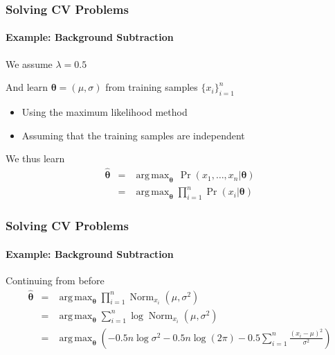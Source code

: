 \documentclass[xetex,professionalfont]{beamer}
\DeclareMathOperator*{\argmax}{arg\,max}
\DeclareMathOperator*{\Norm}{Norm}
\newcommand{\bth}{\boldsymbol{\theta}}
\begin{document}

\begin{frame}
\frametitle{Solving CV Problems}
\framesubtitle{Example: Background Subtraction}

We assume $\lambda=0.5$ %

\bigskip
And learn $\bth=(\mu,\sigma)$ from training samples $\{x_i\}_{i=1}^n$ %
\begin{itemize}
    \item Using the maximum likelihood method %
    \item Assuming that the training samples are independent %
\end{itemize}

\bigskip
We thus learn
\begin{eqnarray*}
  \hat{\bth}&=&\argmax_{\bth}\,\Pr(x_1,\dots,x_n|\bth) \\ %
  &=&\argmax_{\bth}\prod_{i=1}^n \Pr(x_i|\bth) %
\end{eqnarray*}

\end{frame}


\begin{frame}
\frametitle{Solving CV Problems}
\framesubtitle{Example: Background Subtraction}

Continuing from before 
\begin{eqnarray*}
  \hat{\bth}&=&\argmax_{\bth}\prod_{i=1}^n \Norm_{x_i}(\mu,\sigma^2) \\ %
  &=&\argmax_{\bth}\sum_{i=1}^n\log \Norm_{x_i}(\mu,\sigma^2) \\ %
  &=&\argmax_{\bth}\left(-0.5 n\log\sigma^2-0.5n\log(2\pi) - 0.5\sum_{i=1}^n\frac{(x_i-\mu)^2}{\sigma^2}\right)
\end{eqnarray*}

\end{frame}
\end{document}
